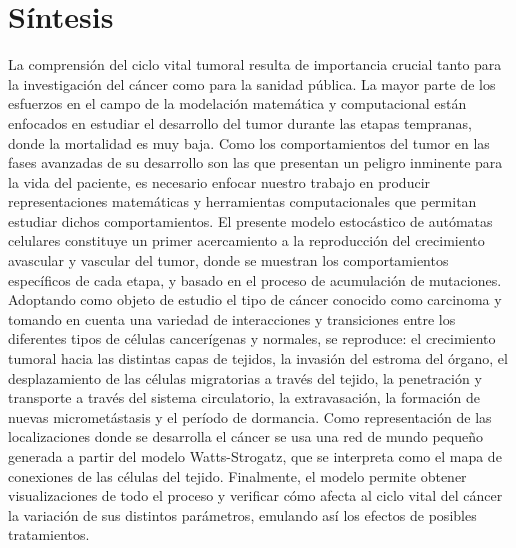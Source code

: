 \section*{S\'intesis}
La comprensi\'on del ciclo vital tumoral resulta de importancia crucial tanto para la investigaci\'on del c\'ancer como para la sanidad p\'ublica. La mayor parte de los esfuerzos en el campo de la modelaci\'on matem\'atica y computacional est\'an enfocados en estudiar el desarrollo del tumor durante las etapas tempranas, donde la mortalidad es muy baja. Como los comportamientos del tumor en las fases avanzadas de su desarrollo son las que presentan un peligro inminente para la vida del paciente, es necesario enfocar nuestro trabajo en producir representaciones matem\'aticas y herramientas computacionales que permitan estudiar dichos comportamientos. El presente modelo estoc\'astico de aut\'omatas celulares constituye un primer acercamiento a la reproducci\'on del crecimiento avascular y vascular del tumor, donde se muestran los comportamientos espec\'ificos de cada etapa, y basado en el proceso de acumulaci\'on de mutaciones. Adoptando como objeto de estudio el tipo de c\'ancer conocido como carcinoma y tomando en cuenta una variedad de interacciones y transiciones entre los diferentes tipos de c\'elulas cancer\'igenas y normales, se reproduce: el crecimiento tumoral hacia las distintas capas de tejidos, la invasi\'on del estroma del \'organo, el desplazamiento de las c\'elulas migratorias a trav\'es del tejido, la penetraci\'on y transporte a trav\'es del sistema circulatorio, la extravasaci\'on, la formaci\'on de nuevas micromet\'astasis y el per\'iodo de dormancia. Como representaci\'on de las localizaciones donde se desarrolla el c\'ancer se usa una red de mundo peque\~no generada a partir del modelo Watts-Strogatz, que se interpreta como el mapa de conexiones de las c\'elulas del tejido. Finalmente, el modelo permite obtener visualizaciones de todo el proceso y verificar c\'omo afecta al ciclo vital del c\'ancer la variaci\'on de sus distintos par\'ametros, emulando as\'i los efectos de posibles tratamientos.

